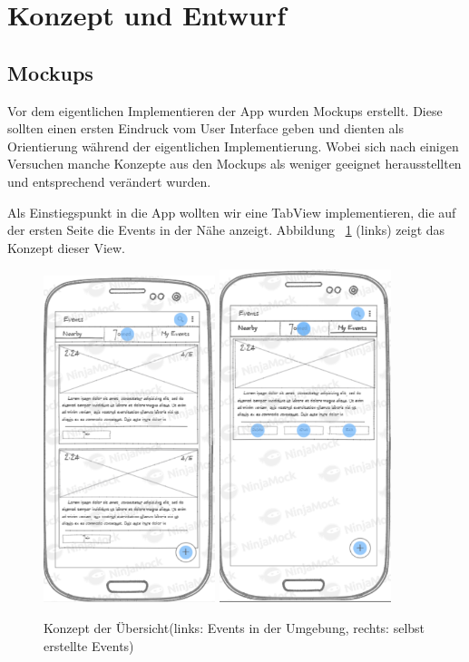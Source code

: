\documentclass{scrartcl}
\begin{document}
\section{Konzept und Entwurf}
\subsection{Mockups}
Vor dem eigentlichen Implementieren der App wurden Mockups erstellt. Diese
sollten einen ersten Eindruck vom User Interface geben und dienten als
Orientierung während der eigentlichen Implementierung. Wobei sich nach einigen Versuchen manche Konzepte aus den Mockups als weniger geeignet herausstellten und entsprechend verändert wurden.

Als Einstiegspunkt in die App wollten wir eine TabView implementieren, die auf der ersten Seite die Events in der Nähe anzeigt. Abbildung ~\ref{fig:nearby_mockup} (links) zeigt das Konzept dieser View.

\begin{figure}[h!tbp]
  \centering
  \includegraphics[width=5cm]{img/nearby_mockup}
  \hspace{1cm}
  \includegraphics[width=5cm]{img/myevents_mockup}
  \caption{Konzept der Übersicht(links: Events in der Umgebung, rechts: selbst erstellte Events)}\label{fig:nearby_mockup}
\end{figure}
\end{document}
